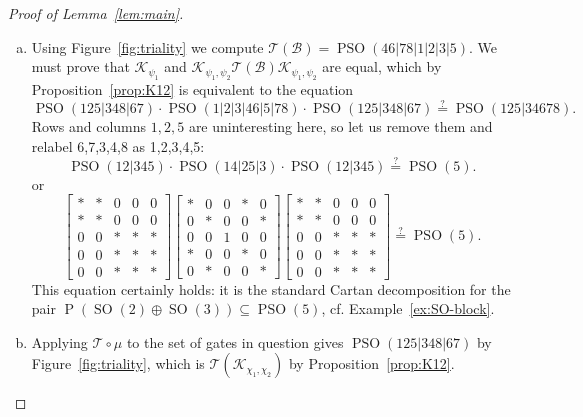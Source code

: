 \documentclass[reqno]{amsart}
\theoremstyle{definition} \newtheorem{example}[theorem]{Example}
\newcommand{\SO}{\operatorname{SO}}
\newcommand{\PSO}{\operatorname{PSO}}
\renewcommand{\P}{\operatorname{P}}
\newcommand{\K}{\mathcal{K}}
\newcommand{\B}{\mathcal{B}}
\newcommand{\T}{\mathcal{T}}
\begin{document}
\begin{proof}[Proof of Lemma~\ref{lem:main}]
\begin{enumerate}[(a)]
\item  Using Figure~\ref{fig:triality} we compute $\T(\B) = \PSO(46|78|1|2|3|5)$.  We must prove that $\K_{\psi_1}$ and $\K_{\psi_1,\psi_2}\T(\B)\K_{\psi_1,\psi_2}$ are equal, which by Proposition~\ref{prop:K12} is equivalent to the equation
\begin{equation*}
\PSO(125|348|67) \cdot \PSO(1|2|3|46|5|78) \cdot \PSO(125|348|67) \overset{?}{=} \PSO(125|34678).
\end{equation*}
Rows and columns $1,2,5$ are uninteresting here, so let us remove them and relabel 6,7,3,4,8 as 1,2,3,4,5:
\begin{equation*}
\PSO(12|345) \cdot \PSO(14|25|3) \cdot \PSO(12|345) \overset{?}{=} \PSO(5).
\end{equation*}
or 
\begin{equation*}
\left[ \begin{smallmatrix}
\ast & \ast & 0 & 0 & 0\\
\ast & \ast & 0 & 0 & 0\\
0 & 0 & \ast & \ast & \ast\\
0 & 0 & \ast & \ast & \ast\\
0 & 0 & \ast & \ast & \ast
\end{smallmatrix}\right] \left[ \begin{smallmatrix}
\ast & 0 & 0 & \ast & 0\\
0 & \ast & 0 & 0 & \ast\\
0 & 0 & 1 & 0 & 0\\
\ast & 0 & 0 & \ast & 0\\
0 & \ast & 0 & 0 & \ast
\end{smallmatrix}\right] \left[ \begin{smallmatrix}
\ast & \ast & 0 & 0 & 0\\
\ast & \ast & 0 & 0 & 0\\
0 & 0 & \ast & \ast & \ast\\
0 & 0 & \ast & \ast & \ast\\
0 & 0 & \ast & \ast & \ast
\end{smallmatrix}\right] \overset{?}{=} \PSO(5).
\end{equation*}
This equation certainly holds: it is the standard Cartan decomposition for the pair $\P(\SO(2) \oplus \SO(3)) \subseteq \PSO(5)$, cf. Example~\ref{ex:SO-block}.

\item Applying $\T \circ \mu$ to the set of gates in question gives $\PSO(125|348|67)$ by Figure~\ref{fig:triality}, which is $\T(\K_{\chi_1,\chi_2})$ by Proposition~\ref{prop:K12}.
\end{enumerate}
\end{proof}
\end{document}
